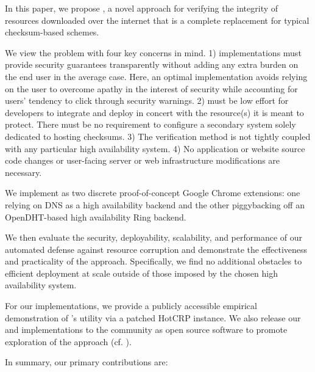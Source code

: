 In this paper, we propose \SYSTEM{}, a novel approach for verifying the
integrity of resources downloaded over the internet that is a complete
replacement for typical checksum-based schemes.

We view the problem with four key concerns in mind. 1) \SYSTEM{} implementations
must provide security guarantees transparently without adding any extra burden
on the end user in the average case. Here, an optimal implementation avoids
relying on the user to overcome apathy in the interest of security while
accounting for users' tendency to click through security warnings. 2) \SYSTEM{}
must be low effort for developers to integrate and deploy in concert with the
resource(s) it is meant to protect. There must be no requirement to configure a
secondary system solely dedicated to hosting checksums. 3) The verification
method is not tightly coupled with any particular high availability system. 4)
No application or website source code changes or user-facing server or web
infrastructure modifications are necessary.

We implement \SYSTEM{} as two discrete proof-of-concept Google Chrome
extensions: one relying on DNS as a high availability backend and the other
piggybacking off an OpenDHT-based high availability Ring backend.

We then evaluate the security, deployability, scalability, and performance of
our automated defense against resource corruption and demonstrate the
effectiveness and practicality of the \SYSTEM{} approach. Specifically, we find
no additional obstacles to efficient deployment at scale outside of those
imposed by the chosen high availability system.

For our implementations, we provide a publicly accessible empirical
demonstration of \SYSTEM{}'s utility via a patched HotCRP instance. We also
release our \DNSSYS{} and \DHTSYS{} implementations to the community as open
source software to promote exploration of the \SYSTEM{} approach (cf.
).

In summary, our primary contributions are: 

